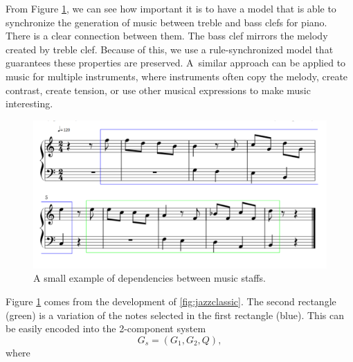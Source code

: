 From Figure \ref{fig:sonatamultistring}, we can see how important it is to have a model that is able to synchronize the generation of music between treble and bass clefs for piano. There is a clear connection between them. The bass clef mirrors the melody created by treble clef. Because of this, we use a rule-synchronized model that guarantees these properties are preserved. A~similar approach can be applied to music for multiple instruments, where instruments often copy the melody, create contrast, create tension, or use other musical expressions to make music interesting.

\begin{figure}[H]
    \centering
    \includegraphics[scale=0.6]{obrazky-figures/motzartalegro.pdf}
    \caption{A small example of dependencies between music staffs.}
    \label{fig:sonatamultistring}
\end{figure}

Figure \ref{fig:sonatamultistring} comes from the development of \ref{fig:jazzclassic}. The second rectangle (green) is a variation of the notes selected in the first rectangle (blue). This can be easily encoded into the 2-component system
$$ G_s = (G_1, G_2, Q),$$ where

